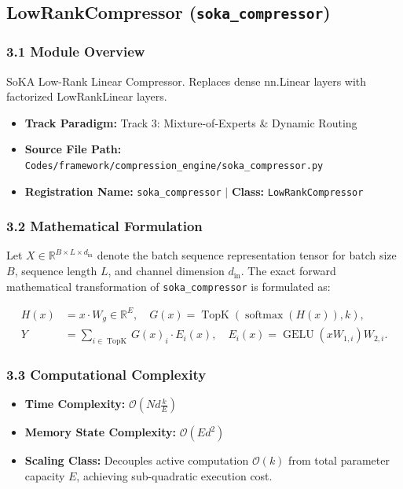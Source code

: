 \subsection{LowRankCompressor (\texttt{soka\_compressor})}
\label{sec:app_module_soka\_compressor}

\subsubsection*{3.1 Module Overview}
SoKA Low-Rank Linear Compressor. Replaces dense nn.Linear layers with factorized LowRankLinear layers.
\begin{itemize}
    \item \textbf{Track Paradigm:} Track 3: Mixture-of-Experts & Dynamic Routing
    \item \textbf{Source File Path:} \texttt{Codes/framework/compression\_engine/soka\_compressor.py}
    \item \textbf{Registration Name:} \texttt{soka\_compressor} $\mid$ \textbf{Class:} \texttt{LowRankCompressor}
\end{itemize}

\subsubsection*{3.2 Mathematical Formulation}
Let $X \in \mathbb{R}^{B \times L \times d_{\text{in}}}$ denote the batch sequence representation tensor for batch size $B$, sequence length $L$, and channel dimension $d_{\text{in}}$. The exact forward mathematical transformation of \texttt{soka\_compressor} is formulated as:

\begin{align}
H(x) &= x \cdot W_g \in \mathbb{R}^{E}, \quad G(x) = \operatorname{TopK}\left(\operatorname{softmax}(H(x)), k\right), \\
Y &= \sum_{i \in \operatorname{TopK}} G(x)_i \cdot E_i(x), \quad E_i(x) = \operatorname{GELU}(x W_{1, i}) W_{2, i}.
\end{align}


\subsubsection*{3.3 Computational Complexity}
\begin{itemize}
    \item \textbf{Time Complexity:} $\mathcal{O}(N d \frac{k}{E})$
    \item \textbf{Memory State Complexity:} $\mathcal{O}(E d^2)$
    \item \textbf{Scaling Class:} Decouples active computation $\mathcal{O}(k)$ from total parameter capacity $E$, achieving sub-quadratic execution cost.
\end{itemize}

